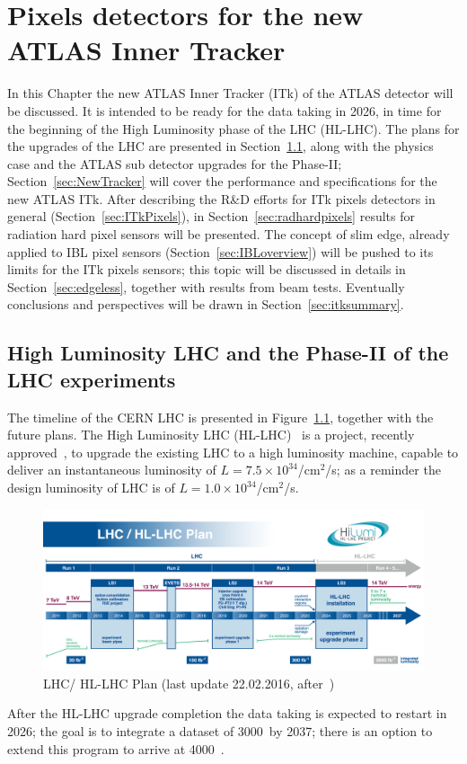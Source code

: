 \chapter{Pixels detectors for the new ATLAS Inner Tracker}
\label{chap:ITk}

In this Chapter the new ATLAS Inner Tracker (ITk) of the ATLAS detector will be discussed. It is intended to be ready 
for  the data taking in 2026, in time for the beginning of the High Luminosity phase of the LHC (HL-LHC). 
The plans for the upgrades of the LHC are presented in Section~\ref{sec:HL-LHC}, along with the 
physics case and the ATLAS sub detector upgrades for the Phase-II; 
Section~\ref{sec:NewTracker} will cover the performance and specifications for the new ATLAS ITk. 
After describing the R\&D efforts for ITk pixels detectors in general (Section~\ref{sec:ITkPixels}), 
in Section~\ref{sec:radhardpixels} results for radiation hard pixel sensors will be presented. 
The concept of slim edge, already applied to IBL pixel sensors (Section~\ref{sec:IBLoverview}) will be 
pushed to its limits for the ITk pixels sensors; this topic will be discussed in details in 
Section~\ref{sec:edgeless}, together with results from beam tests. 
Eventually conclusions and perspectives will be drawn in Section~\ref{sec:itksummary}.



\section{High Luminosity LHC and the Phase-II of the LHC experiments}
\label{sec:HL-LHC}

The timeline of the CERN LHC is presented in Figure~\ref{fig:HL-LHC-plan-2016-01}, together 
with the future plans. The High Luminosity LHC (HL-LHC)~\cite{HL_LHC} is a project, recently 
approved~\cite{HL-LHCApproval},  to upgrade the existing LHC to a high luminosity machine, 
capable to deliver an instantaneous luminosity of $L=7.5\times10^{34}$/cm$^{2}$/s; as a 
reminder the design luminosity of LHC is of $L=1.0\times10^{34}$/cm$^{2}$/s.
\begin{figure}[!htpb]
\centering
\includegraphics[width=1.0\textwidth]{HL-LHC-plan-2016-01.png}
\caption{\label{fig:HL-LHC-plan-2016-01}LHC/ HL-LHC Plan (last update 22.02.2016, after~\cite{HL_LHC})}
\end{figure}
After the HL-LHC upgrade completion the data taking  is expected to restart in 2026; the goal 
is to integrate a dataset of 3000~\invfb by 2037; there is an option to extend this program to arrive 
at 4000~\invfb.

